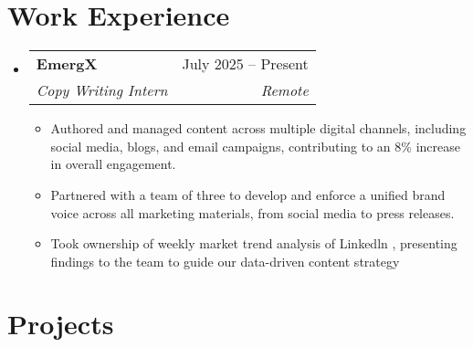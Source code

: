 \documentclass[letterpaper,11pt]{article}
\makeatletter
\newcommand{\resumeItem}[1]{
  \item\small{
    {#1 \vspace{-2pt}}
  }
}
\newcommand{\resumeSubheading}[4]{
  \vspace{-2pt}\item
    \begin{tabular*}{0.97\textwidth}[t]{l@{\extracolsep{\fill}}r}
      \textbf{#1} & #2 \\
      \textit{\small#3} & \textit{\small #4} \\
    \end{tabular*}\vspace{-7pt}
}
\newcommand{\resumeProjectHeading}[2]{
    \item
    \begin{tabular*}{0.97\textwidth}{l@{\extracolsep{\fill}}r}
      \small#1 & #2 \\
    \end{tabular*}\vspace{-7pt}
}
\newcommand{\resumeSubHeadingListStart}{\begin{itemize}[leftmargin=0.15in, label={}]}
\newcommand{\resumeSubHeadingListEnd}{\end{itemize}}
\newcommand{\resumeItemListStart}{\begin{itemize}}
\newcommand{\resumeItemListEnd}{\end{itemize}\vspace{-5pt}}
\makeatother
\begin{document}
\section{Work Experience}
  \resumeSubHeadingListStart
    \resumeSubheading
      {EmergX}{July 2025 -- Present}
{Copy Writing Intern}{Remote}
      \resumeItemListStart
        \resumeItem{Authored and managed content across multiple digital channels, including social media, blogs, and email campaigns, contributing to an 8\% increase in overall engagement.}
        \resumeItem{Partnered with a team of three to develop and enforce a unified brand voice across all marketing materials, from social media to press releases.}
        \resumeItem{Took ownership of weekly market trend analysis of Linkedln , presenting findings to the team to guide our data-driven content strategy}
      \resumeItemListEnd
 \resumeSubHeadingListEnd
 \vspace{-16pt}


\section{Projects}
\end{document}
